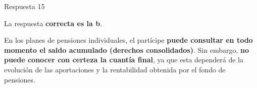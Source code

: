 \documentclass[
  ignorenonframetext,
  aspectratio=54,
  spanish,
]{beamer}
\begin{document}
\begin{frame}{Respuesta 15}
\label{respuesta-15}
\begin{tcolorbox}[enhanced jigsaw, rightrule=.15mm, colback=white, arc=.35mm, colframe=quarto-callout-tip-color-frame, leftrule=.75mm, bottomrule=.15mm, left=2mm, toprule=.15mm, opacityback=0, breakable]
\begin{minipage}[t]{5.5mm}
\textcolor{quarto-callout-tip-color}{\faLightbulb}
\end{minipage}%
\begin{minipage}[t]{\textwidth - 5.5mm}

La respuesta \textbf{correcta es la b}.

En los planes de pensiones individuales, el partícipe \textbf{puede
consultar en todo momento el saldo acumulado (derechos consolidados)}.
Sin embargo, \textbf{no puede conocer con certeza la cuantía final}, ya
que esta dependerá de la evolución de las aportaciones y la rentabilidad
obtenida por el fondo de pensiones.

\end{minipage}%
\end{tcolorbox}
\end{frame}
\end{document}
